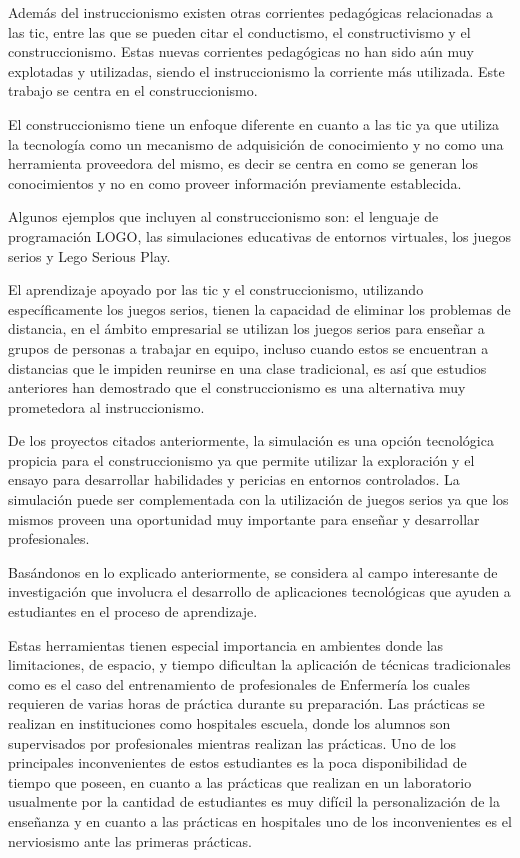 Además del instruccionismo existen otras corrientes pedagógicas relacionadas a
las \Gls{tic}, entre las que se pueden citar el conductismo, el constructivismo
y el construccionismo. Estas nuevas corrientes pedagógicas no han sido aún muy explotadas 
y utilizadas, siendo el instruccionismo la corriente más utilizada. Este trabajo se centra en el construccionismo.

El construccionismo tiene un enfoque diferente en
cuanto a las \Gls{tic} ya que utiliza la tecnología como un mecanismo de
adquisición de conocimiento y no como una herramienta proveedora del
mismo\cite{sasha:construtivism}, es decir se centra en como se generan los
conocimientos y no en como proveer información previamente establecida. 

Algunos ejemplos que incluyen al construccionismo son: 
el lenguaje de programación LOGO, las simulaciones educativas de entornos virtuales, 
los juegos serios y Lego Serious Play.

El aprendizaje apoyado por las \Gls{tic} y el construccionismo, utilizando
específicamente los juegos serios, tienen la capacidad de eliminar los problemas
de distancia, en el ámbito empresarial se utilizan los juegos serios para
enseñar a grupos de personas a trabajar en equipo, incluso cuando estos se
encuentran a distancias que le impiden reunirse en una clase
tradicional\cite{mariluz:seiousgames}, es así que estudios anteriores han
demostrado que el construccionismo es una alternativa muy prometedora al
instruccionismo\cite{sasha:construtivism}. 
   
De los proyectos citados anteriormente, la simulación es una opción tecnológica
propicia para el construccionismo ya que permite utilizar la exploración y el
ensayo para desarrollar habilidades y pericias en entornos
controlados\cite{humphreys2013developing}. La simulación puede ser complementada
con la utilización de juegos serios ya que los mismos proveen una oportunidad
muy importante para enseñar y desarrollar profesionales\cite{sg:aoverview}.

Basándonos en lo explicado anteriormente, se considera al campo interesante  de
investigación que involucra el desarrollo de aplicaciones tecnológicas que
ayuden a estudiantes en el proceso de aprendizaje. 

Estas herramientas tienen especial importancia en ambientes donde las
limitaciones, de espacio, y tiempo dificultan
la aplicación de técnicas tradicionales como es el caso del entrenamiento
de profesionales de Enfermería los cuales requieren de varias horas de práctica
durante su preparación. Las prácticas se realizan en instituciones como hospitales
escuela, donde los alumnos son supervisados por profesionales mientras realizan
las prácticas. Uno de los principales inconvenientes de estos estudiantes es 
la poca disponibilidad de tiempo que poseen, en cuanto a las prácticas que 
realizan en un laboratorio usualmente por la cantidad de estudiantes es muy 
difícil la personalización de la enseñanza y en cuanto a las prácticas en 
hospitales uno de los inconvenientes es el nerviosismo ante las primeras prácticas.

